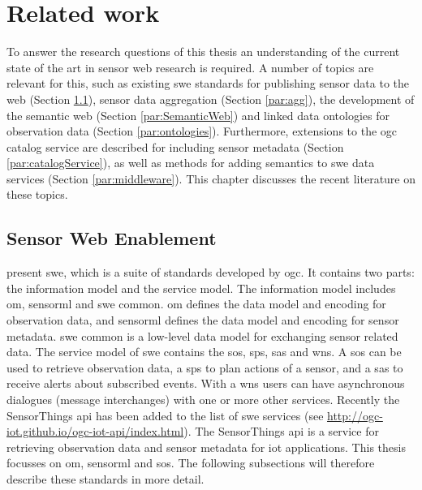 

\chapter{Related work}
\label{chap:rw}
To answer the research questions of this thesis an understanding of the current state of the art in sensor web research is required. A number of topics are relevant for this, such as existing \ac{swe} standards for publishing sensor data to the web (Section \ref{par:SWE}), sensor data aggregation (Section \ref{par:agg}), the development of the semantic web (Section \ref{par:SemanticWeb}) and linked data ontologies for observation data (Section \ref{par:ontologies}). Furthermore, extensions to the \ac{ogc} catalog service are described for including sensor metadata (Section \ref{par:catalogService}), as well as methods for adding semantics to \ac{swe} data services (Section \ref{par:middleware}). This chapter discusses the recent literature on these topics. 

\section{Sensor Web Enablement}
\label{par:SWE}
\cite{SW:OGC} present \acf{swe}, which is a suite of standards developed by \ac{ogc}. It contains two parts: the information model and the service model. The information model includes \ac{om}, \ac{sensorml} and \ac{swe} common. \ac{om} defines the data model and encoding for observation data, and \ac{sensorml} defines the data model and encoding for sensor metadata. \ac{swe} common is a low-level data model for exchanging sensor related data. The service model of \ac{swe} contains the \ac{sos}, \ac{sps}, \ac{sas} and \ac{wns}. A \ac{sos} can be used to retrieve observation data, a \ac{sps} to plan actions of a sensor, and a \ac{sas} to receive alerts about subscribed events. With a \ac{wns} users can have asynchronous dialogues (message interchanges) with one or more other services. Recently the SensorThings \ac{api} has been added to the list of \ac{swe} services (see \url{http://ogc-iot.github.io/ogc-iot-api/index.html}). The SensorThings \ac{api} is a service for retrieving observation data and sensor metadata for \ac{iot} applications. This thesis focusses on \ac{om}, \ac{sensorml} and \ac{sos}. The following subsections will therefore describe these standards in more detail.


